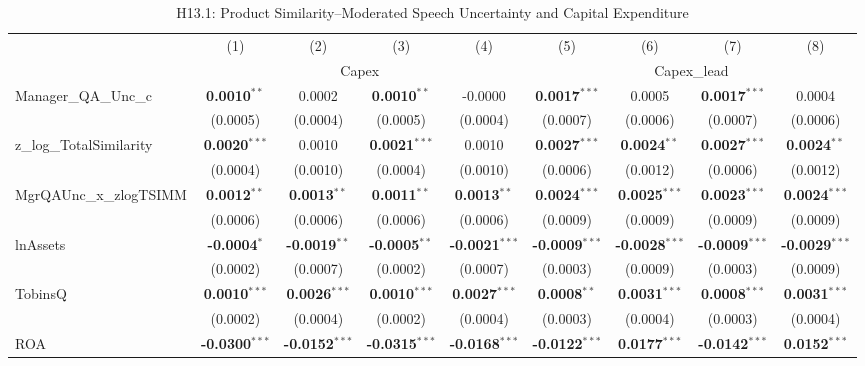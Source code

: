 \documentclass[11pt,a4paper]{article}
\begin{document}
\begin{table}[htbp]
\centering
\caption{H13.1: Product Similarity--Moderated Speech Uncertainty and Capital Expenditure}
\label{tab:h13_1}
\scriptsize
\begin{tabular}{lcccccccc}
\toprule
 & (1) & (2) & (3) & (4) & (5) & (6) & (7) & (8) \\
 & \multicolumn{4}{c}{Capex} & \multicolumn{4}{c}{Capex\_lead} \\
\cmidrule(lr){2-5} \cmidrule(lr){6-9}
\midrule
Manager\_QA\_Unc\_c & \textbf{0.0010}$^{**}$ & 0.0002 & \textbf{0.0010}$^{**}$ & -0.0000 & \textbf{0.0017}$^{***}$ & 0.0005 & \textbf{0.0017}$^{***}$ & 0.0004 \\
 & (0.0005) & (0.0004) & (0.0005) & (0.0004) & (0.0007) & (0.0006) & (0.0007) & (0.0006) \\
z\_log\_TotalSimilarity & \textbf{0.0020}$^{***}$ & 0.0010 & \textbf{0.0021}$^{***}$ & 0.0010 & \textbf{0.0027}$^{***}$ & \textbf{0.0024}$^{**}$ & \textbf{0.0027}$^{***}$ & \textbf{0.0024}$^{**}$ \\
 & (0.0004) & (0.0010) & (0.0004) & (0.0010) & (0.0006) & (0.0012) & (0.0006) & (0.0012) \\
MgrQAUnc\_x\_zlogTSIMM & \textbf{0.0012}$^{**}$ & \textbf{0.0013}$^{**}$ & \textbf{0.0011}$^{**}$ & \textbf{0.0013}$^{**}$ & \textbf{0.0024}$^{***}$ & \textbf{0.0025}$^{***}$ & \textbf{0.0023}$^{***}$ & \textbf{0.0024}$^{***}$ \\
 & (0.0006) & (0.0006) & (0.0006) & (0.0006) & (0.0009) & (0.0009) & (0.0009) & (0.0009) \\
\midrule
lnAssets & \textbf{-0.0004}$^{*}$ & \textbf{-0.0019}$^{**}$ & \textbf{-0.0005}$^{**}$ & \textbf{-0.0021}$^{***}$ & \textbf{-0.0009}$^{***}$ & \textbf{-0.0028}$^{***}$ & \textbf{-0.0009}$^{***}$ & \textbf{-0.0029}$^{***}$ \\
 & (0.0002) & (0.0007) & (0.0002) & (0.0007) & (0.0003) & (0.0009) & (0.0003) & (0.0009) \\
TobinsQ & \textbf{0.0010}$^{***}$ & \textbf{0.0026}$^{***}$ & \textbf{0.0010}$^{***}$ & \textbf{0.0027}$^{***}$ & \textbf{0.0008}$^{**}$ & \textbf{0.0031}$^{***}$ & \textbf{0.0008}$^{***}$ & \textbf{0.0031}$^{***}$ \\
 & (0.0002) & (0.0004) & (0.0002) & (0.0004) & (0.0003) & (0.0004) & (0.0003) & (0.0004) \\
ROA & \textbf{-0.0300}$^{***}$ & \textbf{-0.0152}$^{***}$ & \textbf{-0.0315}$^{***}$ & \textbf{-0.0168}$^{***}$ & \textbf{-0.0122}$^{***}$ & \textbf{0.0177}$^{***}$ & \textbf{-0.0142}$^{***}$ & \textbf{0.0152}$^{***}$ \\

\end{tabular}
\end{table}
\end{document}
